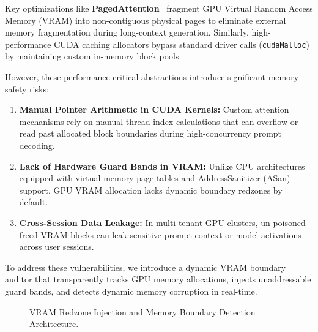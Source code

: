 \documentclass[11pt,a4paper]{article}
\begin{document}
Key optimizations like \textbf{PagedAttention}~\cite{vllm} fragment GPU Virtual Random Access Memory (VRAM) into non-contiguous physical pages to eliminate external memory fragmentation during long-context generation. Similarly, high-performance CUDA caching allocators bypass standard driver calls (\texttt{cudaMalloc}) by maintaining custom in-memory block pools.

However, these performance-critical abstractions introduce significant memory safety risks:
\begin{enumerate}
    \item \textbf{Manual Pointer Arithmetic in CUDA Kernels:} Custom attention mechanisms rely on manual thread-index calculations that can overflow or read past allocated block boundaries during high-concurrency prompt decoding.
    \item \textbf{Lack of Hardware Guard Bands in VRAM:} Unlike CPU architectures equipped with virtual memory page tables and AddressSanitizer (ASan) support, GPU VRAM allocation lacks dynamic boundary redzones by default.
    \item \textbf{Cross-Session Data Leakage:} In multi-tenant GPU clusters, un-poisoned freed VRAM blocks can leak sensitive prompt context or model activations across user sessions.
\end{enumerate}

To address these vulnerabilities, we introduce a dynamic VRAM boundary auditor that transparently tracks GPU memory allocations, injects unaddressable guard bands, and detects dynamic memory corruption in real-time.

\begin{figure}[h!]
\centering
{}
\caption{VRAM Redzone Injection and Memory Boundary Detection Architecture.}
\label{fig:vram_arch}
\end{figure}
\end{document}
